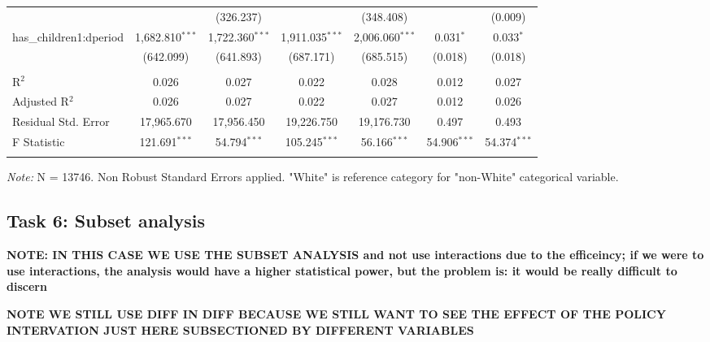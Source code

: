 \documentclass[a4paper]{article}
\begin{document}
\begin{table}[!htbp]
\begin{adjustwidth}{0.cm}{-0cm}
\begin{threeparttable}
\begin{tabular}{@{\extracolsep{-2pt}}lcccccc}
  &  & (326.237) &  & (348.408) &  & (0.009) \\ 
  has\_children1:dperiod & 1,682.810$^{***}$ & 1,722.360$^{***}$ & 1,911.035$^{***}$ & 2,006.060$^{***}$ & 0.031$^{*}$ & 0.033$^{*}$ \\ 
  & (642.099) & (641.893) & (687.171) & (685.515) & (0.018) & (0.018) \\ 
 \hline \\[-1.8ex] 
R$^{2}$ & 0.026 & 0.027 & 0.022 & 0.028 & 0.012 & 0.027 \\ 
Adjusted R$^{2}$ & 0.026 & 0.027 & 0.022 & 0.027 & 0.012 & 0.026 \\ 
Residual Std. Error & 17,965.670 & 17,956.450  & 19,226.750  & 19,176.730 & 0.497  & 0.493  \\ 
F Statistic & 121.691$^{***}$ & 54.794$^{***}$ & 105.245$^{***}$ & 56.166$^{***}$  & 54.906$^{***}$  & 54.374$^{***}$  \\ 
\hline 
\hline \\[-3.5ex] 
\end{tabular} 
\begin{tablenotes}
      \small
      \item\textit{Note:} N = 13746. Non Robust Standard Errors applied. "White" is reference category for "non-White" categorical variable.
    \end{tablenotes}
\end{threeparttable}
\end{adjustwidth}
%
\end{table}





\subsection{Task 6: Subset analysis}
\textbf{NOTE: IN THIS CASE WE USE THE SUBSET ANALYSIS and not use interactions due to the efficeincy; if we were to use interactions, the analysis would have a higher statistical power, but the problem is: it would be really difficult to discern }

\textbf{NOTE WE STILL USE DIFF IN DIFF BECAUSE WE STILL WANT TO SEE THE EFFECT OF THE POLICY INTERVATION JUST HERE SUBSECTIONED BY DIFFERENT VARIABLES }
\end{document}

